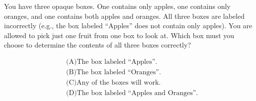 You have three opaque boxes. One contains only apples, one contains only oranges, and one contains both apples and oranges. All three boxes are labeled incorrectly (e.g., the box labeled ``Apples'' does not contain only apples). You are allowed to pick just one fruit from one box to look at. Which box must you choose to determine the contents of all three boxes correctly?



\begin{align*}
&\text{(A)} \text{The box labeled ``Apples''.}\\
&\text{(B)} \text{The box labeled ``Oranges''.}\\
&\text{(C)} \text{Any of the boxes will work.}\\
&\text{(D)} \text{The box labeled ``Apples and Oranges''.}
\end{align*}

